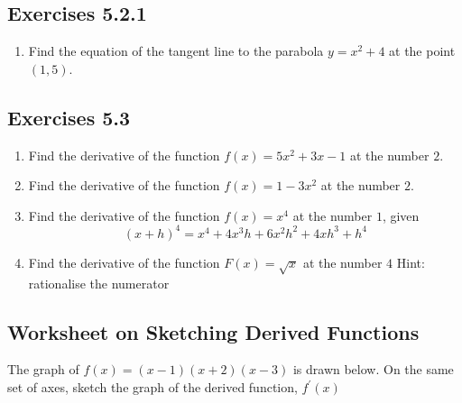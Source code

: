 
\subsection{Exercises 5.2.1}
\begin{enumerate}
\item Find the equation of the tangent line to the parabola $y =x^{2} +4$ at the point $(1 ,5)$. \end{enumerate}



\subsection{Exercises 5.3}
\begin{enumerate}
	\item Find the derivative of the function $f (x) =5 x^{2} +3 x -1$ at the number $2$. 
	
	\item Find the derivative of the function $f (x) =1 -3 x^{2}$ at the number $2$. 
	
	\item Find the derivative of the function $f (x) =x^{4}$ at the number $1$, given
	\begin{equation*}(x +h)^{4} =x^{4} +4 x^{3} h +6 x^{2} h^{2} +4 x h^{3} +h^{4}
	\end{equation*}
	
	\item Find the derivative of the function $F (x) =\sqrt{x}$ at the number $4$ Hint: rationalise the numerator \end{enumerate}


\subsection{Worksheet on Sketching Derived Functions}
The graph of $f (x) =(x -1) (x +2) (x -3)$ is drawn below. On the same set of axes, sketch the graph of the derived function, $f^{ \prime } (x)$\vspace{0.5cm} 


\setlength\fboxrule{0.01in}\setlength\fboxsep{0.2in}
\vspace{0.5cm} 

